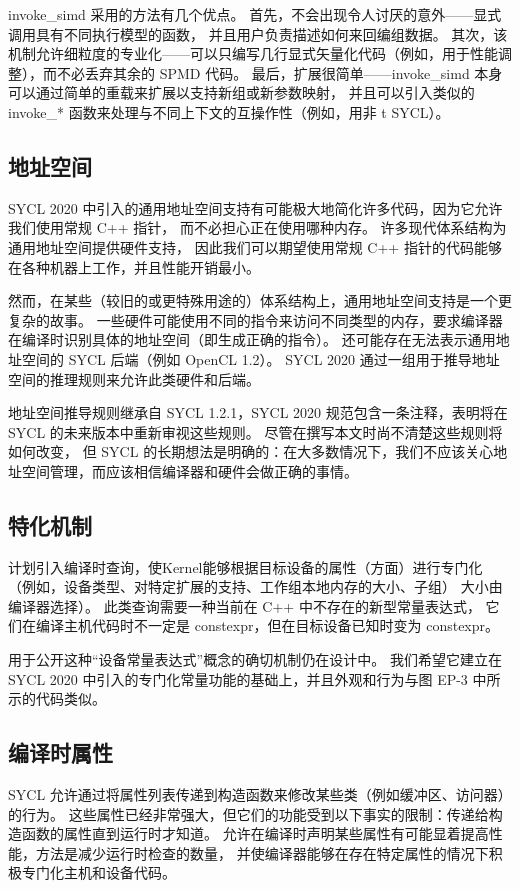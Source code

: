 invoke\_simd 采用的方法有几个优点。 首先，不会出现令人讨厌的意外——显式调用具有不同执行模型的函数，
并且用户负责描述如何来回编组数据。 
其次，该机制允许细粒度的专业化——可以只编写几行显式矢量化代码（例如，用于性能调整），而不必丢弃其余的 SPMD 代码。 
最后，扩展很简单——invoke\_simd 本身可以通过简单的重载来扩展以支持新组或新参数映射，
并且可以引入类似的 invoke\_* 函数来处理与不同上下文的互操作性（例如，用非 t SYCL）。

\subsection{地址空间}
SYCL 2020 中引入的通用地址空间支持有可能极大地简化许多代码，因为它允许我们使用常规 C++ 指针，
而不必担心正在使用哪种内存。 许多现代体系结构为通用地址空间提供硬件支持，
因此我们可以期望使用常规 C++ 指针的代码能够在各种机器上工作，并且性能开销最小。

然而，在某些（较旧的或更特殊用途的）体系结构上，通用地址空间支持是一个更复杂的故事。 
一些硬件可能使用不同的指令来访问不同类型的内存，要求编译器在编译时识别具体的地址空间（即生成正确的指令）。 
还可能存在无法表示通用地址空间的 SYCL 后端（例如 OpenCL 1.2）。 
SYCL 2020 通过一组用于推导地址空间的推理规则来允许此类硬件和后端。

地址空间推导规则继承自 SYCL 1.2.1，SYCL 2020 规范包含一条注释，表明将在 SYCL 的未来版本中重新审视这些规则。 
尽管在撰写本文时尚不清楚这些规则将如何改变，
但 SYCL 的长期想法是明确的：在大多数情况下，我们不应该关心地址空间管理，而应该相信编译器和硬件会做正确的事情。

\subsection{特化机制}
计划引入编译时查询，使Kernel能够根据目标设备的属性（方面）进行专门化
（例如，设备类型、对特定扩展的支持、工作组本地内存的大小、子组） 大小由编译器选择）。 
此类查询需要一种当前在 C++ 中不存在的新型常量表达式，
它们在编译主机代码时不一定是 constexpr，但在目标设备已知时变为 constexpr。

用于公开这种“设备常量表达式”概念的确切机制仍在设计中。 
我们希望它建立在 SYCL 2020 中引入的专门化常量功能的基础上，并且外观和行为与图 EP-3 中所示的代码类似。

\subsection{编译时属性}
SYCL 允许通过将属性列表传递到构造函数来修改某些类（例如缓冲区、访问器）的行为。 
这些属性已经非常强大，但它们的功能受到以下事实的限制：传递给构造函数的属性直到运行时才知道。 
允许在编译时声明某些属性有可能显着提高性能，方法是减少运行时检查的数量，
并使编译器能够在存在特定属性的情况下积极专门化主机和设备代码。

